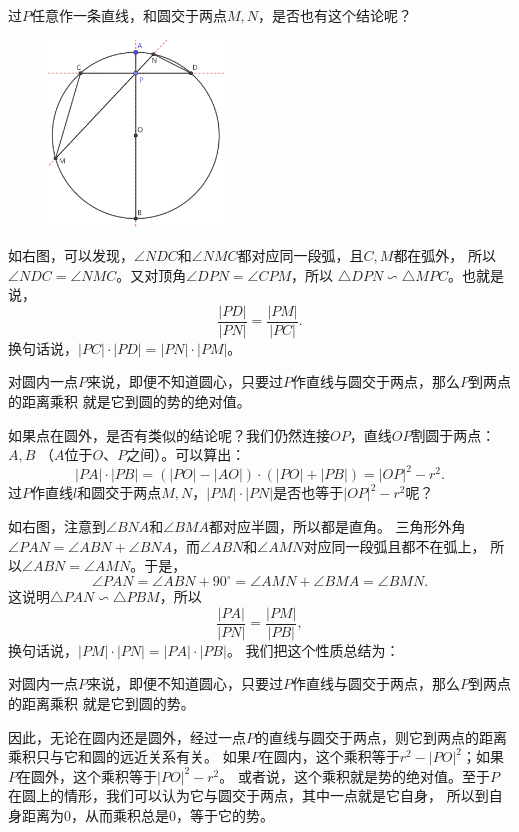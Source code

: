 \documentclass[12pt,UTF8]{ctexbook}
\begin{document}
过$P$任意作一条直线，和圆交于两点$M,N$，是否也有这个结论呢？

\begin{figure} %
    \vspace{-14pt}
    \flushright
    \includegraphics[width=0.42\textwidth]{圆势1.png}
\end{figure}

如右图，可以发现，$\angle NDC$和$\angle NMC$都对应同一段弧，且$C,M$都在弧外，
所以$\angle NDC = \angle NMC$。又对顶角$\angle DPN = \angle CPM$，所以
$ \triangle DPN \backsim \triangle MPC$。也就是说，
$$ \frac{|PD|}{|PN|} = \frac{|PM|}{|PC|}.$$
换句话说，$|PC| \cdot |PD| = |PN|\cdot|PM|$。

对圆内一点$P$来说，即便不知道圆心，只要过$P$作直线与圆交于两点，那么$P$到两点的距离乘积
就是它到圆的势的绝对值。

如果点在圆外，是否有类似的结论呢？我们仍然连接$OP$，直线$OP$割圆于两点：$A,B$
（$A$位于$O$、$P$之间）。可以算出：
$$|PA|\cdot|PB| = (|PO| - |AO|) \cdot (|PO| + |PB|) = |OP|^2 - r^2.$$
过$P$作直线$l$和圆交于两点$M,N$，$|PM| \cdot |PN|$是否也等于$|OP|^2 - r^2$呢？

如右图，注意到$\angle BNA$和$\angle BMA$都对应半圆，所以都是直角。
三角形外角$\angle PAN = \angle ABN + \angle BNA$，而$\angle ABN$和$\angle AMN$对应同一段弧且都不在弧上，
所以$\angle ABN = \angle AMN$。于是，
$$\angle PAN = \angle ABN + 90^\circ = \angle AMN + \angle BMA = \angle BMN.$$
这说明$\triangle PAN \backsim \triangle PBM$，所以
$$ \frac{|PA|}{|PN|} = \frac{|PM|}{|PB|},$$
换句话说，$|PM|\cdot |PN| = |PA|\cdot |PB|$。
我们把这个性质总结为：

对圆内一点$P$来说，即便不知道圆心，只要过$P$作直线与圆交于两点，那么$P$到两点的距离乘积
就是它到圆的势。

因此，无论在圆内还是圆外，经过一点$P$的直线与圆交于两点，则它到两点的距离乘积只与它和圆的远近关系有关。
如果$P$在圆内，这个乘积等于$r^2 - |PO|^2$；如果$P$在圆外，这个乘积等于$|PO|^2 - r^2$。
或者说，这个乘积就是势的绝对值。至于$P$在圆上的情形，我们可以认为它与圆交于两点，其中一点就是它自身，
所以到自身距离为$0$，从而乘积总是$0$，等于它的势。
\end{document}

